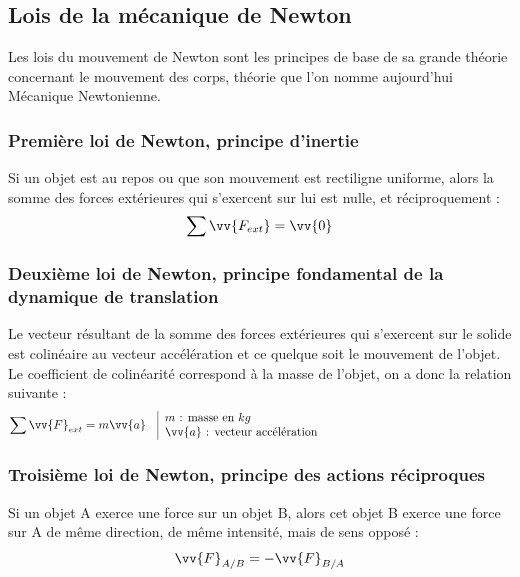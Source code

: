 \documentclass[12pt]{article}
\begin{document}
\subsection{Lois de la mécanique de Newton}
Les lois du mouvement de Newton sont les principes de base de sa grande théorie concernant le mouvement des corps, théorie que l'on nomme aujourd'hui Mécanique Newtonienne.
\subsubsection{Première loi de Newton, principe d'inertie}
Si un objet est au repos ou que son mouvement est rectiligne uniforme, alors la somme des forces extérieures qui s'exercent sur lui est nulle, et réciproquement :
\\
$$\sum \vv{F_{ext}} = \vv{0}$$
\subsubsection{Deuxième loi de Newton, principe fondamental de la dynamique de translation}
Le vecteur résultant de la somme des forces extérieures qui s'exercent sur le solide est colinéaire au vecteur accélération et ce quelque soit le mouvement de l'objet. Le coefficient de colinéarité correspond à la masse de l'objet, on a donc la relation suivante :
\\
\begin{align*}
\sum \vv{F}_{ext} &= m\vv{a} & \begin{tabular}{|p{10cm}}
$m$ : masse en $kg$ \\
$\vv{a}$ : vecteur accélération
\end{tabular}
\end{align*}
\subsubsection{Troisième loi de Newton, principe des actions réciproques}
Si un objet A exerce une force sur un objet B, alors cet objet B exerce une force sur A de même direction, de même intensité, mais de sens opposé :
\\
$$\vv{F}_{A/B} = -\vv{F}_{B/A}$$
\end{document}
